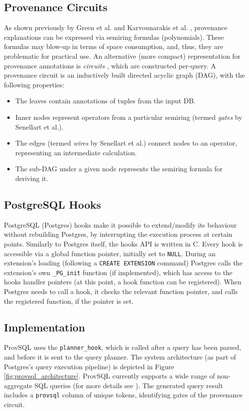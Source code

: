 \subsection{Provenance Circuits}\label{sec:provenance circuits}
As shown previously by Green et al. \cite{green2007provenance} and Karvounarakis et al. \cite{Karvounarakis:2012:SDQ:2380776.2380778}, provenance explanations can be expressed via semiring formulas (polynomials). These formulas may blow-up in terms of space consumption, and, thus, they are problematic for practical use. An alternative (more compact) representation for provenance annotations is  \textit{circuits} \cite{Deutch2014, Senellart2017}, which are constructed per-query. A provenance circuit is an inductively built directed acyclic graph (DAG), with the following properties:
\begin{itemize}
    \item The leaves contain annotations of tuples from the input DB.
    \item Inner nodes represent operators from a particular semiring (termed \textit{gates} by Senellart et al.). 
    \item The edges (termed \textit{wires} by Senellart et al.) connect nodes to an operator, representing an intermediate calculation.
    \item The sub-DAG under a given node represents the semiring formula for deriving it. 
\end{itemize}
\subsection{PostgreSQL Hooks} PostgreSQL (Postgres) hooks \cite{postgre_hooks} make it possible to extend/modify its behaviour without rebuilding Postgres, by interrupting the execution process at certain points. Similarly to Postgres itself, the hooks API is written in C. Every hook is accessible via a global function pointer, initially set to \texttt{NULL}. During an extension's loading (following a \texttt{CREATE EXTENSION} command) Postgres calls the extension's own \texttt{\_PG\_init} function (if implemented), which has access to the hooks handler pointers (at this point, a hook function can be registered). When Postgres needs to call a hook, it checks the relevant function pointer, and calls the registered function, if the pointer is set.

\subsection{Implementation} ProvSQL \cite{provsql_github} uses the \texttt{planner\_hook}, which is called after a query has been parsed, and before it is sent to the query planner. The system architecture (as part of Postgres's query execution pipeline) is depicted in Figure \ref{fig:provsql_architecture}.
ProvSQL currently supports a wide range of non-aggregate SQL queries (for more details see \cite{provsql_github, Senellart2018}). The generated query result includes a \texttt{provsql} column of unique\footnotemark
{}
tokens, identifying gates of the provenance circuit.

